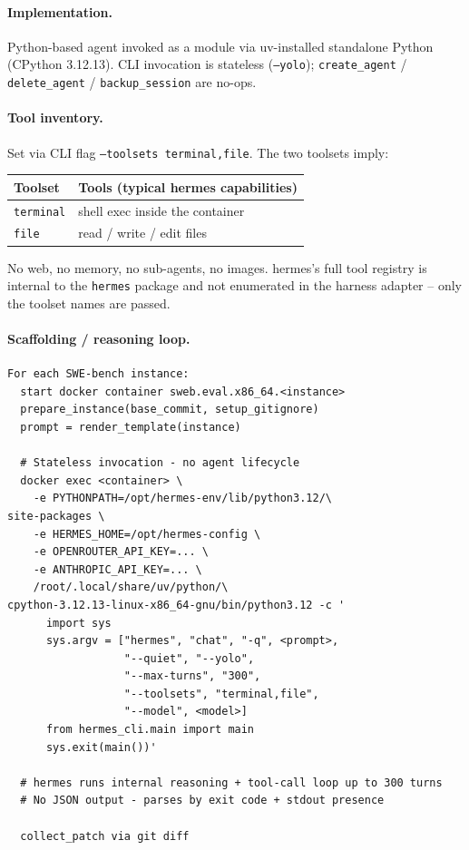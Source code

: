 \paragraph{Implementation.}
Python-based agent invoked as a module via uv-installed standalone Python (CPython 3.12.13). CLI invocation is stateless (\texttt{--yolo}); \texttt{create\_agent} / \texttt{delete\_agent} / \texttt{backup\_session} are no-ops.

\paragraph{Tool inventory.}
Set via CLI flag \texttt{--toolsets terminal,file}. The two toolsets imply:

\begin{center}
\begin{tabular}{ll}
\toprule
\textbf{Toolset} & \textbf{Tools (typical hermes capabilities)} \\
\midrule
\texttt{terminal} & shell exec inside the container \\
\texttt{file}     & read / write / edit files \\
\bottomrule
\end{tabular}
\end{center}

No web, no memory, no sub-agents, no images. hermes's full tool registry is internal to the \texttt{hermes} package and not enumerated in the harness adapter -- only the toolset names are passed.

\paragraph{Scaffolding / reasoning loop.}
\begin{verbatim}
For each SWE-bench instance:
  start docker container sweb.eval.x86_64.<instance>
  prepare_instance(base_commit, setup_gitignore)
  prompt = render_template(instance)

  # Stateless invocation - no agent lifecycle
  docker exec <container> \
    -e PYTHONPATH=/opt/hermes-env/lib/python3.12/\
site-packages \
    -e HERMES_HOME=/opt/hermes-config \
    -e OPENROUTER_API_KEY=... \
    -e ANTHROPIC_API_KEY=... \
    /root/.local/share/uv/python/\
cpython-3.12.13-linux-x86_64-gnu/bin/python3.12 -c '
      import sys
      sys.argv = ["hermes", "chat", "-q", <prompt>,
                  "--quiet", "--yolo",
                  "--max-turns", "300",
                  "--toolsets", "terminal,file",
                  "--model", <model>]
      from hermes_cli.main import main
      sys.exit(main())'

  # hermes runs internal reasoning + tool-call loop up to 300 turns
  # No JSON output - parses by exit code + stdout presence

  collect_patch via git diff
\end{verbatim}


